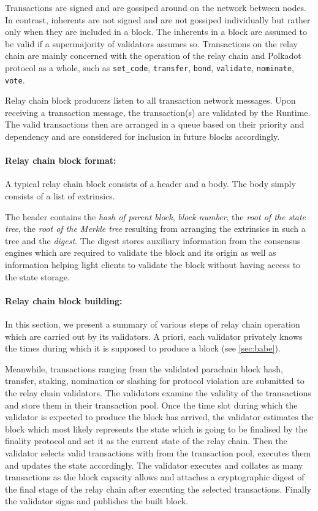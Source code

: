\documentclass{article}
\begin{document}
Transactions are signed and are gossiped around on the network between nodes. In contrast, inherents are not signed and are not gossiped individually but rather only when they are included in a block. The inherents in a block are assumed to be valid if a supermajority of validators assumes so.  
Transactions on the relay chain are mainly concerned with the operation of the relay chain and Polkadot protocol as a whole, such as \texttt{set\_code}, \texttt{transfer}, \texttt{bond}, \texttt{validate}, \texttt{nominate}, \texttt{vote}.

Relay chain block producers listen to all transaction network messages. Upon receiving a transaction message, the transaction(s) are validated by the Runtime. The valid transactions then are arranged in a queue based on their priority and dependency and are considered for inclusion in future blocks accordingly.

\paragraph{Relay chain block format:}
A typical relay chain block consists of a header and a body. The body simply consists of a list of extrinsics.

The header contains the \textit{hash of parent block}, \textit{block number}, the \textit{root of the state tree}, the \textit{root of the Merkle tree} resulting from arranging the extrinsics in such a tree and the \textit{digest}. The digest stores auxiliary information from the consensus engines which are required to validate the block and its origin as well as information helping light clients to validate the block without having access to the state storage.

\paragraph{Relay chain block building:}\label{sec:relaychainblockproduction}
In this section, we present a summary of various steps of relay chain operation which are carried out by its validators. A priori, each validator privately knows the times during which it is supposed to produce a block (see \ref{sec:babe}).

Meanwhile, transactions ranging from the validated parachain block hash, transfer, staking, nomination or slashing for protocol violation are submitted to the relay chain validators. The validators examine the validity of the transactions and store them in their transaction pool. Once the time slot during which the validator is expected to produce the block has arrived, the validator estimates the block which most likely represents the state which is going to be finalised by the finality protocol and set it as the current state of the relay chain. Then the validator selects valid transactions with from the transaction pool, executes them and updates the state accordingly. The validator executes and collates as many transactions as the block capacity allows and attaches a cryptographic digest of the final stage of the relay chain after executing the selected transactions. Finally the validator signs and publishes the built block.
\end{document}
